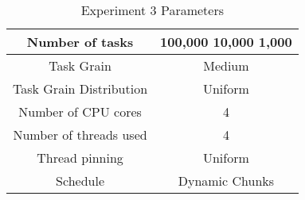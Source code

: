 \begin{table}
\centering
 \begin{tabular}{|c|c|}
  \hline
  Number of tasks & 100,000 10,000 1,000 \\
  \hline
  Task Grain & Medium \\
  \hline
  Task Grain Distribution & Uniform \\
  \hline
  Number of CPU cores & 4 \\
  \hline
  Number of threads used & 4 \\
  \hline
  Thread pinning & Uniform \\
  \hline
  Schedule & Dynamic Chunks \\
  \hline
 \end{tabular}
\caption{Experiment 3 Parameters}
\iflabelc
\label{table:evaluation_ex3_parameters}
\fi
{}
\end{table}
